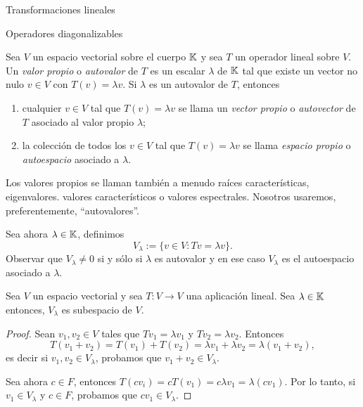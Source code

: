 \begin{chapter}{Transformaciones lineales}
\begin{section}{Operadores diagonalizables}
        \begin{definicion}
            Sea $V$ un espacio vectorial sobre el cuerpo $\mathbb K$ y sea $T$ un operador lineal sobre $V$. Un \textit{valor propio} o \textit{autovalor} de $T$ es un escalar $\lambda$ de $\mathbb K$ tal que existe un vector no nulo $v \in V$ con $T(v) = \lambda v$. Si $\lambda$ es un autovalor de $T$, entonces
            \begin{enumerate}
                \item  cualquier  $v \in V$ tal que $T(v) = \lambda v$  se llama un \textit{vector propio} o  \textit{autovector} de $T$ asociado al valor propio $\lambda$;
                \item la colección de todos los $v \in V$ tal que $T(v) = \lambda v$  se llama \textit{espacio propio} o \textit{autoespacio} 	asociado a $\lambda$. 
            \end{enumerate}
            
            Los valores propios se llaman también a menudo raíces características, eigenvalores. valores característicos o valores espectrales. Nosotros usaremos, preferentemente, ``autovalores''.
            
            Sea ahora $\lambda \in \mathbb K$, definimos
            $$
            V_\lambda := \{v \in V: Tv = \lambda v \}.
            $$
            Observar que $V_\lambda \ne 0$ si y sólo si $\lambda$ es autovalor y en ese caso $V_\lambda$  es el autoespacio asociado a $\lambda$. 
        \end{definicion}
        
        
        \begin{teorema}
            Sea $V$ un espacio vectorial y sea $T:V \to V$ una aplicación lineal. Sea $\lambda \in \mathbb K$ entonces, $V_\lambda$  es subespacio de $V$.
        \end{teorema}
        \begin{proof}
            Sean $v_1,v_2 \in V$ tales que $Tv_1 = \lambda v_1$ y $Tv_2 = \lambda v_2$. Entonces
            $$
            T(v_1+v_2) = T(v_1)+ T(v_2) = \lambda v_1 + \lambda v_2 = \lambda (v_1 + v_2),
            $$
            es decir si  $v_1,v_2 \in V_\lambda$, probamos que $v_1+v_2 \in V_\lambda$. 
            
            Sea ahora $c \in F$, entonces $T(cv_i) = cT(v_1) = c\lambda v_1 = \lambda (cv_1)$. Por lo tanto, si  $v_1\in V_\lambda$ y $c \in F$, probamos que $cv_1 \in V_\lambda$.
            

\end{proof}
\end{section}
\end{chapter}
